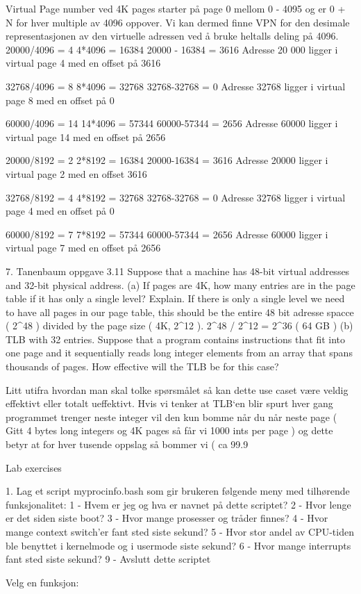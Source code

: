 Virtual Page number ved 4K pages starter på page 0 mellom 0 - 4095 og er 0 + N for hver multiple av 4096 oppover. Vi kan dermed finne VPN for den desimale representasjonen av den virtuelle adressen ved å bruke heltalls deling på 4096. 
20000/4096 = 4
4*4096 = 16384 
20000 - 16384 = 3616
Adresse 20 000 ligger i virtual page 4 med en offset på 3616

32768/4096 = 8
8*4096 = 32768
32768-32768 = 0
Adresse 32768 ligger i virtual page 8 med en offset på 0

60000/4096 = 14
14*4096 = 57344
60000-57344 = 2656
Adresse 60000 ligger i virtual page 14 med en offset på 2656

20000/8192 = 2
2*8192 = 16384
20000-16384 = 3616
Adresse 20000 ligger i virtual page 2 med en offset 3616

32768/8192 = 4
4*8192 = 32768
32768-32768 = 0
Adresse 32768 ligger i virtual page 4 med en offset på 0

60000/8192 = 7
7*8192 = 57344
60000-57344 = 2656
Adresse 60000 ligger i virtual page 7 med en offset på 2656

7. Tanenbaum oppgave 3.11
Suppose that a machine has 48-bit virtual addresses and 32-bit physical address.
(a) If pages are 4K, how many entries are in the page table if it has only a single level? Explain.
If there is only a single level we need to have all pages in our page table, this should be the entire 48 bit adresse spacce ( 2^48 ) divided by the page size ( 4K, 2^12 ). 
2^48 / 2^12 = 2^36 ( 64 GB ) 
(b) TLB with 32 entries. Suppose that a program contains instructions that fit into one page and it sequentially reads long integer elements from an array that spans thousands of pages. How effective will the TLB be for this case?

Litt utifra hvordan man skal tolke spørsmålet så kan dette use caset være veldig effektivt eller totalt ueffektivt. Hvis vi tenker at TLB`en blir spurt hver gang programmet trenger neste integer vil den kun bomme når du når neste page ( Gitt 4 bytes long integers og 4K pages så får vi 1000 ints per page )  og dette betyr at for hver tusende oppslag så bommer vi ( ca 99.9%

Lab exercises

1. Lag et script myprocinfo.bash som gir brukeren følgende meny med tilhørende funksjonalitet:
1 - Hvem er jeg og hva er navnet på dette scriptet?
2 - Hvor lenge er det siden siste boot?
3 - Hvor mange prosesser og tråder finnes?
4 - Hvor mange context switch'er fant sted siste sekund?
5 - Hvor stor andel av CPU-tiden ble benyttet i kernelmode
     og i usermode siste sekund?
6 - Hvor mange interrupts fant sted siste sekund?
9 - Avslutt dette scriptet

Velg en funksjon:

